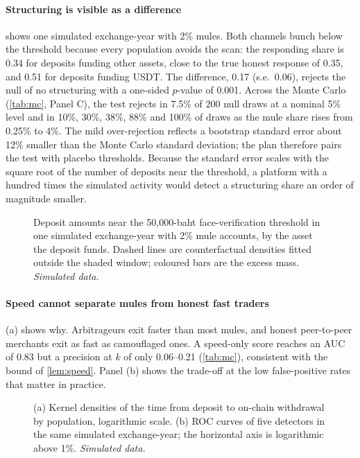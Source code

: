 \paragraph{Structuring is visible as a difference}
 shows one simulated exchange-year with 2\% mules. Both channels bunch below the threshold because
every population avoids the scan: the responding share is 0.34 for deposits funding other assets, close to the
true honest response of 0.35, and 0.51 for deposits funding USDT. The difference, 0.17 (s.e.\ 0.06), rejects the null
of no structuring with a one-sided $p$-value of 0.001. Across the Monte Carlo (\cref{tab:mc}, Panel C), the test rejects
in 7.5\% of 200 null draws at a nominal 5\% level and in 10\%, 30\%, 38\%, 88\% and 100\% of draws as the mule share
rises from 0.25\% to 4\%. The mild over-rejection reflects a bootstrap standard error about 12\% smaller than the
Monte Carlo standard deviation; the plan therefore pairs the test with placebo thresholds. Because the standard error
scales with the square root of the number of deposits near the threshold, a platform with a hundred times the
simulated activity would detect a structuring share an order of magnitude smaller.

\begin{figure}[!htbp]
\centering
{}
\caption{Deposit amounts near the 50,000-baht face-verification threshold in one simulated exchange-year with 2\% mule
accounts, by the asset the deposit funds. Dashed lines are counterfactual densities fitted outside the shaded window;
coloured bars are the excess mass. \emph{Simulated data.}}
\label{fig:bunching}
\end{figure}

\paragraph{Speed cannot separate mules from honest fast traders}
(a) shows why. Arbitrageurs exit faster than most mules, and honest peer-to-peer merchants exit as
fast as camouflaged ones. A speed-only score reaches an AUC of 0.83 but a precision at $k$ of only 0.06--0.21
(\cref{tab:mc}), consistent with the bound of \cref{lem:speed}. Panel (b) shows the trade-off at the low false-positive
rates that matter in practice.

\begin{figure}[!htbp]
\centering
{}
\caption{(a) Kernel densities of the time from deposit to on-chain withdrawal by population, logarithmic scale.
(b) ROC curves of five detectors in the same simulated exchange-year; the horizontal axis is logarithmic above 1\%.
\emph{Simulated data.}}
\label{fig:dwellroc}
\end{figure}

